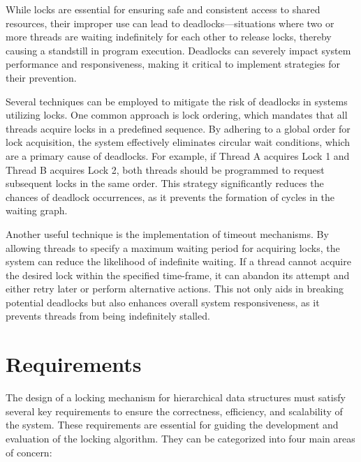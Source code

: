 While locks are essential for ensuring safe and consistent access to shared resources, their improper use can lead to deadlocks—situations where two or more threads are waiting indefinitely for each other to release locks, thereby causing a standstill in program execution. Deadlocks can severely impact system performance and responsiveness, making it critical to implement strategies for their prevention.

Several techniques can be employed to mitigate the risk of deadlocks in systems utilizing locks. One common approach is lock ordering, which mandates that all threads acquire locks in a predefined sequence. By adhering to a global order for lock acquisition, the system effectively eliminates circular wait conditions, which are a primary cause of deadlocks. For example, if Thread A acquires Lock 1 and Thread B acquires Lock 2, both threads should be programmed to request subsequent locks in the same order. This strategy significantly reduces the chances of deadlock occurrences, as it prevents the formation of cycles in the waiting graph.

Another useful technique is the implementation of timeout mechanisms. By allowing threads to specify a maximum waiting period for acquiring locks, the system can reduce the likelihood of indefinite waiting. If a thread cannot acquire the desired lock within the specified time-frame, it can abandon its attempt and either retry later or perform alternative actions. This not only aids in breaking potential deadlocks but also enhances overall system responsiveness, as it prevents threads from being indefinitely stalled.



\section{Requirements} \label{sec:requirements}

The design of a locking mechanism for hierarchical data structures must satisfy several key requirements to ensure the correctness, efficiency, and scalability of the system. These requirements are essential for guiding the development and evaluation of the locking algorithm. 
They can be categorized into four main areas of concern:

